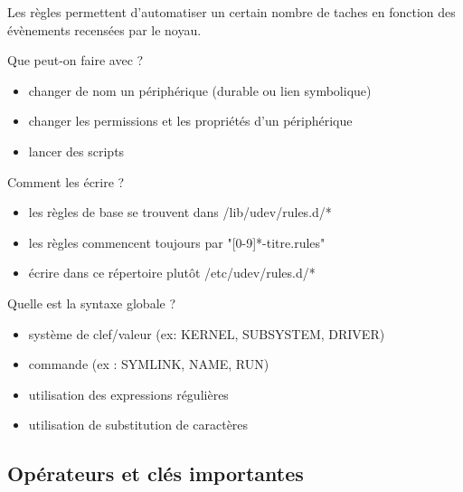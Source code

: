 \documentclass{beamer}
\begin{document}
\begin{frame}
Les règles permettent d'automatiser un certain nombre de taches en fonction des évènements recensées par le noyau.

\begin{block}{Que peut-on faire avec ?} 
	
	\begin{itemize}
		[circle]
		\item changer de nom un périphérique (durable ou lien symbolique)
		\item changer les permissions et les propriétés d'un périphérique
		\item lancer des scripts
	\end{itemize}
\end{block}

\begin{block}{Comment les écrire ?} 
	
	\begin{itemize}
		[circle]
		\item les règles de base se trouvent dans /lib/udev/rules.d/*
		\item les règles commencent toujours par "[0-9]*-titre.rules"
		\item écrire dans ce répertoire plutôt /etc/udev/rules.d/*
	\end{itemize}
\end{block}
\end{frame}

\begin{frame}
\begin{block}{Quelle est la syntaxe globale ?} 
	
	\begin{itemize}
		[circle]
		\item système de clef/valeur (ex: KERNEL, SUBSYSTEM, DRIVER) 
		\item commande (ex : SYMLINK, NAME, RUN)
		\item utilisation des expressions régulières
		\item utilisation de substitution de caractères
	\end{itemize}
\end{block}
\end{frame}

\subsection{Opérateurs et clés importantes}
\end{document}
